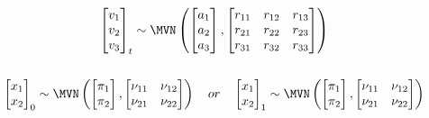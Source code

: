 \begin{gather*}
\begin{bmatrix}v_1\\ v_2\\ v_3\end{bmatrix}_t \sim \MVN\begin{pmatrix}\begin{bmatrix}a_1\\ a_2\\ a_3\end{bmatrix},
 \begin{bmatrix}r_{11}&r_{12}&r_{13}\\r_{21}&r_{22}&r_{23}\\r_{31}&r_{32}&r_{33}\end{bmatrix} \end{pmatrix}  \\
\\
\begin{bmatrix}x_1\\ x_2\end{bmatrix}_0 \sim \MVN\begin{pmatrix}\begin{bmatrix}\pi_1\\ \pi_2\end{bmatrix},\begin{bmatrix}\nu_{11}&\nu_{12}\\ \nu_{21}&\nu_{22}\end{bmatrix} \end{pmatrix} \quad 
or\quad 
\begin{bmatrix}x_1\\ x_2\end{bmatrix}_1 \sim \MVN\begin{pmatrix}\begin{bmatrix}\pi_1\\ \pi_2\end{bmatrix},\begin{bmatrix}\nu_{11}&\nu_{12}\\ \nu_{21}&\nu_{22}\end{bmatrix} \end{pmatrix} 
\end{gather*}

